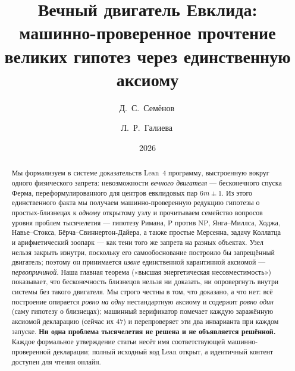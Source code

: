 \documentclass[11pt,a4paper]{amsart}
\title[Вечный двигатель Евклида]{Вечный двигатель Евклида:\\
  машинно-проверенное прочтение великих гипотез через единственную аксиому}
\author[Д.~С.~Семёнов]{Д.~С.~Семёнов\,\orcidlink{0009-0006-6213-0638}}
\author[Л.~Р.~Галиева]{Л.~Р.~Галиева\,\orcidlink{0009-0009-8656-6040}}
\date{2026}
\begin{document}
\begin{abstract}
Мы формализуем в системе доказательств Lean~4 программу, выстроенную вокруг одного
физического запрета: невозможности \emph{вечного двигателя} --- бесконечного спуска Ферма,
переформулированного для центров евклидовых пар $6m\pm1$. Из этого единственного факта мы
получаем машинно-проверенную редукцию гипотезы о простых-близнецах к \emph{одному} открытому
узлу и прочитываем семейство вопросов уровня проблем тысячелетия --- гипотезу Римана,
$\mathrm{P}$ против $\mathrm{NP}$, Янга--Миллса, Ходжа, Навье--Стокса,
Бёрча--Свиннертон-Дайера, а также простые Мерсенна, задачу Коллатца и арифметический
зоопарк --- как тени того же запрета на разных объектах. Узел нельзя закрыть изнутри,
поскольку его самообоснование построило бы запрещённый двигатель; поэтому он принимается
\emph{извне} единственной карантинной аксиомой --- \emph{первопричиной}. Наша главная теорема
(«высшая энергетическая несовместимость») показывает, что бесконечность близнецов нельзя ни
доказать, ни опровергнуть внутри системы без такого двигателя. Мы строго честны в том, что
доказано, а что нет: всё построение опирается \emph{ровно на одну} нестандартную аксиому и
содержит \emph{ровно один}  (саму гипотезу о близнецах); машинный верификатор
помечает каждую заражённую аксиомой декларацию (сейчас их $47$) и перепроверяет эти два
инварианта при каждом запуске. \textbf{Ни одна проблема тысячелетия не решена и не объявляется
решённой.} Каждое формальное утверждение статьи несёт имя соответствующей машинно-проверенной
декларации; полный исходный код Lean открыт, а идентичный контент доступен для чтения онлайн.
\end{abstract}

\maketitle

\begin{center}\small
{}
\end{center}
\end{document}
